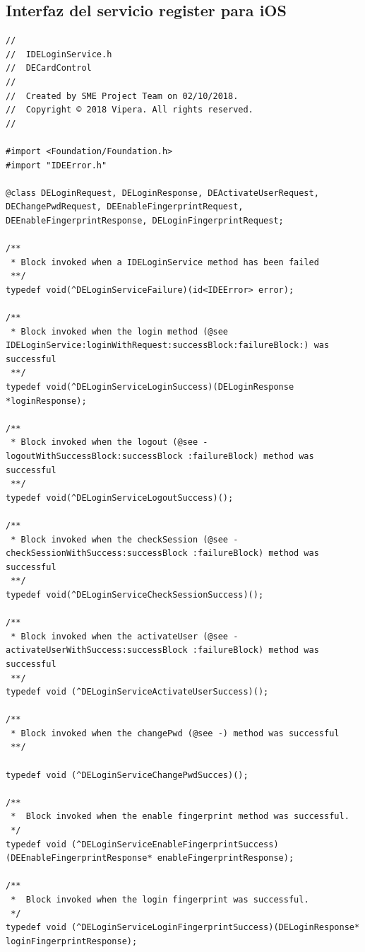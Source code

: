 \documentclass[a4paper, 12pt]{article}
\newenvironment{code}{\captionsetup{type=listing}}{}
\begin{document}
\subsection{Interfaz del servicio register para iOS}
\label{sec-6-3}
\begin{code}
\label{code:ios-interface}
\begin{verbatim}
//
//  IDELoginService.h
//  DECardControl
//
//  Created by SME Project Team on 02/10/2018.
//  Copyright © 2018 Vipera. All rights reserved.
//

#import <Foundation/Foundation.h>
#import "IDEError.h"

@class DELoginRequest, DELoginResponse, DEActivateUserRequest, DEChangePwdRequest, DEEnableFingerprintRequest, DEEnableFingerprintResponse, DELoginFingerprintRequest;

/**
 * Block invoked when a IDELoginService method has been failed
 **/
typedef void(^DELoginServiceFailure)(id<IDEError> error);

/**
 * Block invoked when the login method (@see IDELoginService:loginWithRequest:successBlock:failureBlock:) was successful
 **/
typedef void(^DELoginServiceLoginSuccess)(DELoginResponse *loginResponse);

/**
 * Block invoked when the logout (@see -logoutWithSuccessBlock:successBlock :failureBlock) method was successful
 **/
typedef void(^DELoginServiceLogoutSuccess)();

/**
 * Block invoked when the checkSession (@see -checkSessionWithSuccess:successBlock :failureBlock) method was successful
 **/
typedef void(^DELoginServiceCheckSessionSuccess)();

/**
 * Block invoked when the activateUser (@see -activateUserWithSuccess:successBlock :failureBlock) method was successful
 **/
typedef void (^DELoginServiceActivateUserSuccess)();

/**
 * Block invoked when the changePwd (@see -) method was successful
 **/

typedef void (^DELoginServiceChangePwdSucces)();

/**
 *  Block invoked when the enable fingerprint method was successful.
 */
typedef void (^DELoginServiceEnableFingerprintSuccess)(DEEnableFingerprintResponse* enableFingerprintResponse);

/**
 *  Block invoked when the login fingerprint was successful.
 */
typedef void (^DELoginServiceLoginFingerprintSuccess)(DELoginResponse* loginFingerprintResponse);


\end{verbatim}
\end{code}
\end{document}

